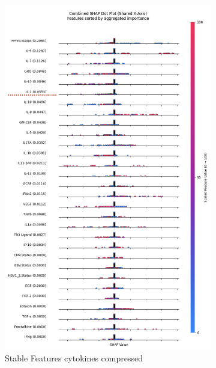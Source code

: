 \documentclass[12pt,a4paper]{report}
\begin{document}
\begin{figure}[h!]
    \begin{subfigure}[b]{0.48\textwidth}
        \centering
        \includegraphics[width=\textwidth]{images/stable_features_cytokines.png}
        \caption{Stable Features cytokines compressed}
        \label{fig:stable_features_cytokines_compressed}
    \end{subfigure}
    \hfill
    \begin{subfigure}[b]{0.48\textwidth}
        \centering

\end{subfigure}
\end{figure}
\end{document}
